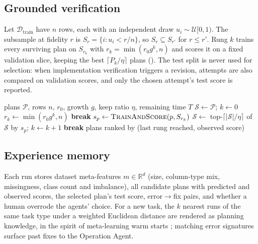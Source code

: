 \subsection{Grounded verification}
Let $\mathcal{D}_\text{train}$ have $n$ rows, each with an independent draw $u_i \sim \mathcal{U}[0,1)$. The subsample at fidelity $r$ is $S_r = \{i : u_i < r/n\}$, so $S_r \subseteq S_{r'}$ for $r \le r'$. Rung $k$ trains every surviving plan on $S_{r_k}$ with $r_k = \min(r_0 g^k, n)$ and scores it on a fixed validation slice, keeping the best $\lceil P_k/\eta \rceil$ plans (). The test split is never used for selection: when implementation verification triggers a revision, attempts are also compared on validation scores, and only the chosen attempt's test score is reported.

\begin{algorithm}[t]
\caption{Budget-aware grounded verification}
\label{alg:grounding}
\begin{algorithmic}[1]
\Require plans $\mathcal{P}$, rows $n$, $r_0$, growth $g$, keep ratio $\eta$, remaining time $T$
\State $\mathcal{S} \gets \mathcal{P}$;\; $k \gets 0$
  \State $r_k \gets \min(r_0 g^k, n)$
   \textbf{break} \EndIf
   \State $s_p \gets \textsc{TrainAndScore}(p, S_{r_k})$ \EndFor
  \State $\mathcal{S} \gets$ top-$\lceil |\mathcal{S}|/\eta \rceil$ of $\mathcal{S}$ by $s_p$;\; $k \gets k+1$
   \textbf{break} \EndIf
\EndWhile
\State \Return plans ranked by (last rung reached, observed score)
\end{algorithmic}
\end{algorithm}

\subsection{Experience memory}
Each run stores dataset meta-features $m \in \mathbb{R}^d$ (size, column-type mix, missingness, class count and imbalance), all candidate plans with predicted and observed scores, the selected plan's test score, error$\to$fix pairs, and whether a human overrode the agents' choice. For a new task, the $k$ nearest runs of the same task type under a weighted Euclidean distance are rendered as planning knowledge, in the spirit of meta-learning warm starts \citep{feurer2015autosklearn}; matching error signatures surface past fixes to the Operation Agent.

